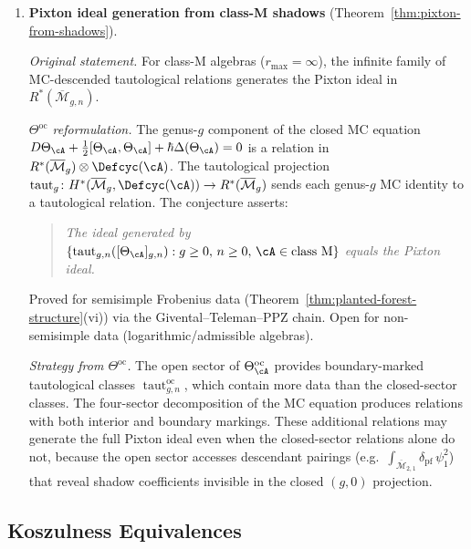 \begin{enumerate}[label=\textup{(\arabic*)}]
\item \textbf{Pixton ideal generation from class-M shadows}
 (Theorem~\ref{thm:pixton-from-shadows}).

 \smallskip\noindent
 \emph{Original statement.}
 For class-M algebras ($r_{\max} = \infty$), the infinite
 family of MC-descended tautological relations generates the
 Pixton ideal in $R^*(\overline{\mathcal{M}}_{g,n})$.

 \smallskip\noindent
 \emph{$\Theta^{\mathrm{oc}}$ reformulation.}
 The genus-$g$ component of the closed MC equation
 $D\Theta_\cA + \tfrac{1}{2}[\Theta_\cA, \Theta_\cA]
 + \hbar\Delta(\Theta_\cA) = 0$
 is a relation in
 $R^*(\overline{\mathcal{M}}_g)
 \otimes \Defcyc(\cA)$.
 The tautological projection
 $\operatorname{taut}_g \colon
 H^*(\overline{\mathcal{M}}_g, \Defcyc(\cA))
 \to R^*(\overline{\mathcal{M}}_g)$
 sends each genus-$g$ MC identity to a tautological relation.
 The conjecture asserts:
 \begin{quote}
 \emph{The ideal generated by
 $\{\operatorname{taut}_{g,n}
 ([\Theta_\cA]_{g,n}) :
 g \geq 0,\, n \geq 0,\, \cA \in \text{class M}\}$
 equals the Pixton ideal.}
 \end{quote}
 Proved for semisimple Frobenius data
 (Theorem~\ref{thm:planted-forest-structure}(vi))
 via the Givental--Teleman--PPZ chain. Open for non-semisimple
 data (logarithmic/admissible algebras).

 \smallskip\noindent
 \emph{Strategy from $\Theta^{\mathrm{oc}}$.}
 The open sector of $\Theta^{\mathrm{oc}}_\cA$
 provides boundary-marked tautological classes
 $\operatorname{taut}_{g,n}^{\mathrm{oc}}$, which contain
 more data than the closed-sector classes.
 The four-sector decomposition of the MC equation
 produces relations with both interior and boundary
 markings. These additional relations may generate
 the full Pixton ideal even when the
 closed-sector relations alone do not, because the
 open sector accesses descendant pairings (e.g.\
 $\int_{\overline{\mathcal{M}}_{2,1}}
 \delta_{\mathrm{pf}}\,\psi_1^2$) that reveal
 shadow coefficients invisible in the closed
 $(g,0)$ projection.

\end{enumerate}

\subsection{Koszulness Equivalences}

